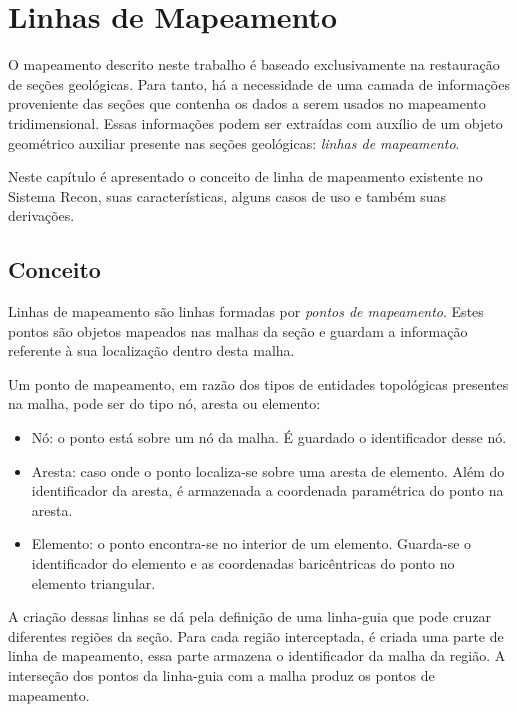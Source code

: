 
\chapter{Linhas de Mapeamento}

O mapeamento descrito neste trabalho é baseado exclusivamente na restauração de seções geológicas. Para tanto, há a necessidade de uma camada de informações proveniente das seções que contenha os dados a serem usados no mapeamento tridimensional. Essas informações podem ser extraídas com auxílio de um objeto geométrico auxiliar presente nas seções geológicas: \textit{linhas de mapeamento}.

Neste capítulo é apresentado o conceito de linha de mapeamento existente no Sistema Recon, suas características, alguns casos de uso e também suas derivações.

\section{Conceito}

Linhas de mapeamento são linhas formadas por \textit{pontos de mapeamento}. Estes pontos são objetos mapeados nas malhas da seção e guardam a informação referente à sua localização dentro desta malha.

Um ponto de mapeamento, em razão dos tipos de entidades topológicas presentes na malha, pode ser do tipo nó, aresta ou elemento:

\renewcommand{\labelitemi}{•}
\begin{itemize}
  \item Nó: o ponto está sobre um nó da malha. É guardado o identificador desse nó.
  \item Aresta: caso onde o ponto localiza-se sobre uma aresta de elemento. Além do identificador da aresta, é armazenada a coordenada paramétrica do ponto na aresta.
  \item Elemento: o ponto encontra-se no interior de um elemento. Guarda-se o identificador do elemento e as coordenadas baricêntricas do ponto no elemento triangular.
\end{itemize}

A criação dessas linhas se dá pela definição de uma linha-guia que pode cruzar diferentes regiões da seção. Para cada região interceptada, é criada uma parte de linha de mapeamento, essa parte armazena o identificador da malha da região. A interseção dos pontos da linha-guia com a malha produz os pontos de mapeamento.

